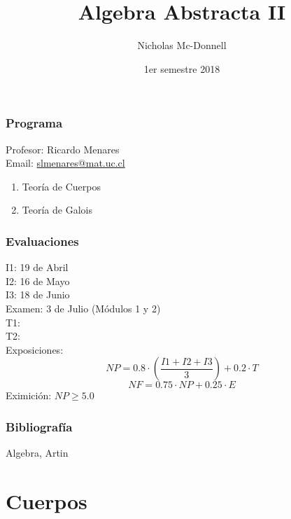 

\title{Algebra Abstracta II}
\author{Nicholas Mc-Donnell}
\date{1er semestre 2018}



    \maketitle

    \section*{Programa}
    {\raggedleft Profesor: Ricardo Menares}\\
    Email: \url{slmenares@mat.uc.cl}
    \begin{enumerate}
        \item Teoría de Cuerpos

        \item Teoría de Galois
    \end{enumerate}

    \section*{Evaluaciones}
    {\raggedleft I1: 19 de Abril}\\
    I2: 16 de Mayo\\
    I3: 18 de Junio\\
    Examen: 3 de Julio (Módulos 1 y 2)\\
    T1:\\
    T2:\\
    Exposiciones:\\

    \[NP = 0.8\cdot\left(\frac{I1+I2+I3}{3}\right)+0.2\cdot T\]
    \[NF = 0.75\cdot NP+0.25\cdot E\]
    Eximición: $NP\geq 5.0$

    \section*{Bibliografía}
    Algebra, Artin

    \newpage

    \tableofcontents

    \part{Cuerpos}
